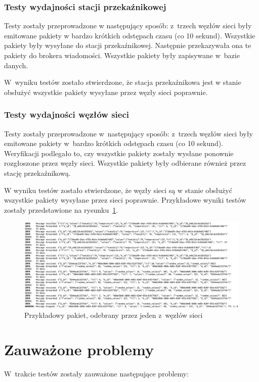 \subsubsection{Testy wydajności stacji przekaźnikowej}
Testy zostały przeprowadzone w następujący sposób: z~trzech węzłów sieci były emitowane pakiety w bardzo krótkich odstępach czasu (co 10 sekund).
Wszystkie pakiety były wysyłane do stacji przekaźnikowej.
Następnie przekazywała ona te pakiety do brokera wiadomości.
Wszystkie pakiety były zapisywane w~bazie danych.

W~wyniku testów zostało stwierdzone, że stacja przekaźnikowa jest w stanie obsłużyć wszystkie pakiety wysyłane przez węzły sieci poprawnie.

\subsubsection{Testy wydajności węzłów sieci}
Testy zostały przeprowadzone w~następujący sposób: z~trzech węzłów sieci były emitowane pakiety w~bardzo krótkich odstępach czasu (co 10 sekund).
Weryfikacji podlegało to, czy wszystkie pakiety zostały wysłane ponownie rozgłoszone przez węzły sieci.
Wszystkie pakiety były odbierane również przez stację przekaźnikową.

W wyniku testów zostało stwierdzone, że węzły sieci są w stanie obsłużyć wszystkie pakiety wysyłane przez sieci poprawnie.
Przykładowe wyniki testów zostały przedstawione na rysunku~\ref{rys:odbijanie-pakietu}.

\begin{figure}[b!]
    \begin{center}
        \includegraphics[width=13cm]{pic/odbijanie-pakietu.png}
    \end{center}
    \caption{Przykładowy pakiet, odebrany przez jeden z~węzłów sieci}\label{rys:odbijanie-pakietu}
\end{figure}

\section{Zauważone problemy}
W~trakcie testów zostały zauważone następujące problemy:
